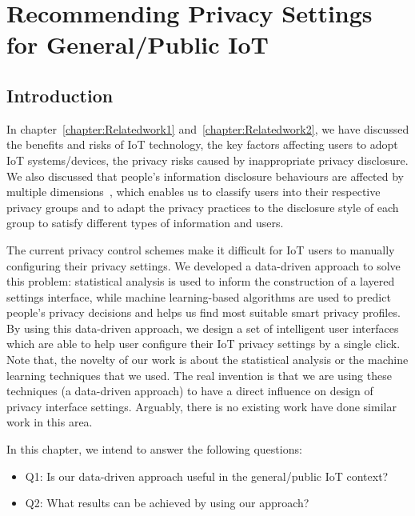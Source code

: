 \chapter{Recommending Privacy Settings for General/Public IoT}\label{chapter:generalIoT}

\section{Introduction}
In chapter~\ref{chapter:Relatedwork1} and~\ref{chapter:Relatedwork2}, we have discussed the benefits and risks of IoT technology, the key factors affecting users to adopt IoT systems/devices, the privacy risks caused by inappropriate privacy disclosure. We also discussed that people’s information disclosure behaviours are affected by multiple dimensions~\cite{knijnenburg2013dimensionality}, which enables us to classify users into their respective privacy groups and to adapt the privacy practices to the disclosure style of each group to satisfy different types of information and users. 

The current privacy control schemes make it difficult for IoT users to manually configuring their privacy settings. We developed a data-driven approach to solve this problem: statistical analysis is used to inform the construction of a layered settings interface, while machine learning-based algorithms are used to predict people’s privacy decisions and helps us find most suitable smart privacy profiles. By using this data-driven approach, we design a set of intelligent user interfaces which are able to help user configure their IoT privacy settings by a single click. Note that, the novelty of our work is about the statistical analysis or the machine learning techniques that we used. The real invention is that we are using these techniques (a data-driven approach) to have a direct influence on design of privacy interface settings. Arguably, there is no existing work have done similar work in this area.

In this chapter, we intend to answer the following questions:
\begin{itemize}
	\item Q1: Is our data-driven approach useful in the general/public IoT context?
	\item Q2: What results can be achieved by using our approach?
\end{itemize}

